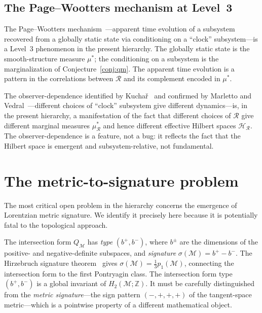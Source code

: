 \documentclass[12pt,a4paper]{article}
\theoremstyle{definition}
\theoremstyle{remark}
\begin{document}
\subsection{The Page--Wootters mechanism at Level~3}

The Page--Wootters mechanism~\cite{page_wootters}---apparent time evolution
of a subsystem recovered from a globally static state via conditioning on a
``clock'' subsystem---is a Level~3 phenomenon in the present hierarchy. The
globally static state is the smooth-structure measure $\mu^*$; the
conditioning on a subsystem is the marginalization of Conjecture~\ref{conj:qm}.
The apparent time evolution is a pattern in the correlations between
$\mathcal{R}$ and its complement encoded in $\mu^*$.

The observer-dependence identified by Kucha\v{r}~\cite{kuchar} and confirmed
by Marletto and Vedral~\cite{marletto_vedral}---different choices of ``clock''
subsystem give different dynamics---is, in the present hierarchy, a manifestation
of the fact that different choices of $\mathcal{R}$ give different marginal
measures $\mu^*_\mathcal{R}$ and hence different effective Hilbert spaces
$\mathcal{H}_\mathcal{R}$. The observer-dependence is a feature, not a bug:
it reflects the fact that the Hilbert space is emergent and subsystem-relative,
not fundamental.

\section{The metric-to-signature problem}
\label{sec:signature}

The most critical open problem in the hierarchy concerns the emergence of
Lorentzian metric signature. We identify it precisely here because it is
potentially fatal to the topological approach.

The intersection form $Q_\mathcal{M}$ has \emph{type} $(b^+, b^-)$, where
$b^\pm$ are the dimensions of the positive- and negative-definite subspaces,
and \emph{signature} $\sigma(\mathcal{M}) = b^+ - b^-$. The Hirzebruch
signature theorem~\cite{hirzebruch} gives $\sigma(\mathcal{M}) =
\frac{1}{3}p_1(\mathcal{M})$, connecting the intersection form to the first
Pontryagin class. The intersection form type $(b^+, b^-)$ is a global invariant
of $H_2(\mathcal{M};\mathbb{Z})$. It must be carefully distinguished from the
\emph{metric signature}---the sign pattern $(-,+,+,+)$ of the tangent-space
metric---which is a pointwise property of a different mathematical object.
\end{document}
